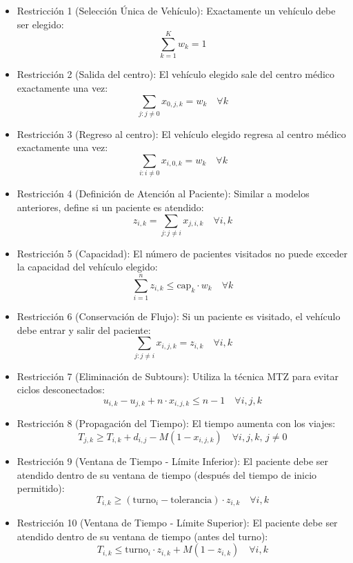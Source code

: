 \documentclass[12pt]{article}
\begin{document}
\begin{itemize}
    \item Restricción 1 (Selección Única de Vehículo): Exactamente un vehículo debe ser elegido:
    $$\sum_{k=1}^{K} w_k = 1$$
    
    \item Restricción 2 (Salida del centro): El vehículo elegido sale del centro médico exactamente una vez:
    $$\sum_{j: j \ne 0} x_{0,j,k} = w_k \quad \forall k$$
    
    \item Restricción 3 (Regreso al centro): El vehículo elegido regresa al centro médico exactamente una vez:
    $$\sum_{i: i \ne 0} x_{i,0,k} = w_k \quad \forall k$$
    
    \item Restricción 4 (Definición de Atención al Paciente): Similar a modelos anteriores, define si un paciente es atendido:
    $$z_{i,k} = \sum_{j: j \ne i} x_{j,i,k} \quad \forall i,k$$
    
    \item Restricción 5 (Capacidad): El número de pacientes visitados no puede exceder la capacidad del vehículo elegido:
    $$\sum_{i=1}^{n} z_{i,k} \leq \text{cap}_k \cdot w_k \quad \forall k$$
    
    \item Restricción 6 (Conservación de Flujo): Si un paciente es visitado, el vehículo debe entrar y salir del paciente:
    $$\sum_{j: j \ne i} x_{i,j,k} = z_{i,k} \quad \forall i,k$$
    
    \item Restricción 7 (Eliminación de Subtours): Utiliza la técnica MTZ para evitar ciclos desconectados:
    $$u_{i,k} - u_{j,k} + n \cdot x_{i,j,k} \leq n - 1 \quad \forall i,j,k$$
    
    \item Restricción 8 (Propagación del Tiempo): El tiempo aumenta con los viajes:
    $$T_{j,k} \geq T_{i,k} + d_{i,j} - M(1 - x_{i,j,k}) \quad \forall i,j,k, \, j \ne 0$$
    
    \item Restricción 9 (Ventana de Tiempo - Límite Inferior): El paciente debe ser atendido dentro de su ventana de tiempo (después del tiempo de inicio permitido):
    $$T_{i,k} \geq (\text{turno}_i - \text{tolerancia}) \cdot z_{i,k} \quad \forall i,k$$

    \item Restricción 10 (Ventana de Tiempo - Límite Superior): El paciente debe ser atendido dentro de su ventana de tiempo (antes del turno):
    $$T_{i,k} \leq \text{turno}_i \cdot z_{i,k} + M(1 - z_{i,k}) \quad \forall i,k$$
\end{itemize}
\end{document}
